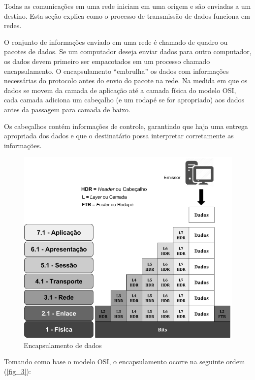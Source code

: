 \documentclass[
12pt,				%
openright,			%
oneside,			%
a4paper,			%
brazil,				%
]{abntex2}
\begin{document}
	\par Todas as comunicações em uma rede iniciam em uma origem e são enviadas a um destino. Esta seção explica como o processo de transmissão de dados funciona em redes.
	
	\par O conjunto de informações enviado em uma rede é chamado de quadro ou pacotes de dados. Se um computador deseja enviar dados para outro computador, os dados devem primeiro ser empacotados em um processo chamado encapsulamento. O encapsulamento “embrulha” os dados com informações necessárias do protocolo antes do envio do pacote na rede. Na medida em que os dados se movem da camada de aplicação até a camada física do modelo OSI, cada camada adiciona um cabeçalho (e um rodapé se for apropriado) aos dados antes da passagem para camada de baixo. 
	
	\par Os cabeçalhos contém informações de controle, garantindo que haja uma entrega apropriada dos dados e que o destinatário possa interpretar corretamente as informações.
	
	\begin{figure} [H]
		\centering
		\includegraphics[scale=.5]{figuras/cap2/03EncapsulamentoDedados}
		\caption{\label{fig_3}Encapsulamento de dados}
	\end{figure}	
	
	\par Tomando como base o modelo OSI, o encapsulamento ocorre na seguinte ordem (\autoref{fig_3}):
	
\end{document}
